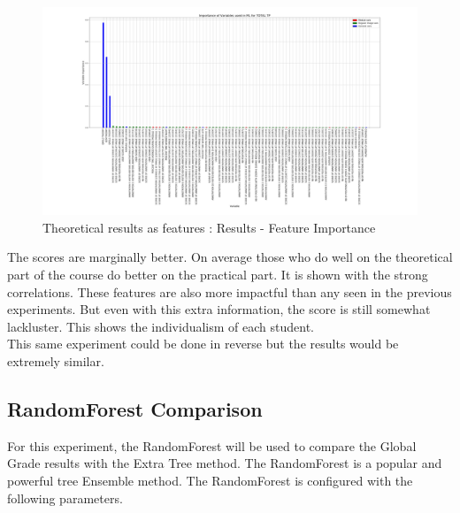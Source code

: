 \documentclass[a4paper,11pt]{report}
\numberwithin{figure}{chapter} %
\begin{document}
      \begin{figure}[H]
      \centering
      \includegraphics[width=.95\linewidth]{plots/test2_var_importance_TOTAL_TP_2018-05-18_02_51_43.png}
      \caption{Theoretical results as features : Results - Feature Importance}
      \label{fig:test2_2}
      \end{figure}
    The scores are marginally better.
    On average those who do well on the theoretical part of the course do better on the practical part.
    It is shown with the strong correlations.
    These features are also more impactful than any seen in the previous experiments.
    But even with this extra information, the score is still somewhat lackluster.
    This shows the individualism of each student.\\

    This same experiment could be done in reverse but the results would be extremely similar.

    \subsection{RandomForest Comparison}

    For this experiment, the RandomForest will be used to compare the Global Grade results with the Extra Tree method.
    The RandomForest is a popular and powerful tree Ensemble method.
    The RandomForest is configured with the following parameters.
\end{document}
